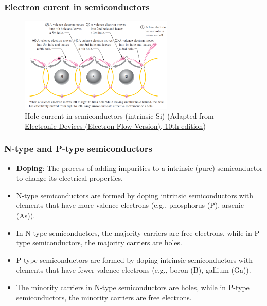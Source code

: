 \begin{frame}
	\frametitle{Electron curent in semiconductors}
    \begin{figure}
        \centering
        \includegraphics[width=0.65\textwidth]{fig/lec02/hole_current.png}
        \caption{Hole current in semiconductors (intrinsic Si) (Adapted from \href{https://www.pearson.com/en-us/subject-catalog/p/electronic-devices-electron-flow-version/P200000001048/9780137556755}{Electronic Devices (Electron Flow Version), 10th edition})}
    \end{figure}
\end{frame}

\begin{frame}
	\frametitle{N-type and P-type semiconductors}
    \begin{itemize}
        \item \textbf{Doping}: The process of adding impurities to a intrinsic (pure) semiconductor to change its electrical properties.
        \item N-type semiconductors are formed by doping intrinsic semiconductors with elements that have more valence electrons (e.g., phosphorus (P), arsenic (As)).
        \item In N-type semiconductors, the majority carriers are free electrons, while in P-type semiconductors, the majority carriers are holes.
        \item P-type semiconductors are formed by doping intrinsic semiconductors with elements that have fewer valence electrons (e.g., boron (B), gallium (Ga)).
        \item The minority carriers in N-type semiconductors are holes, while in P-type semiconductors, the minority carriers are free electrons.
    \end{itemize}
\end{frame}

